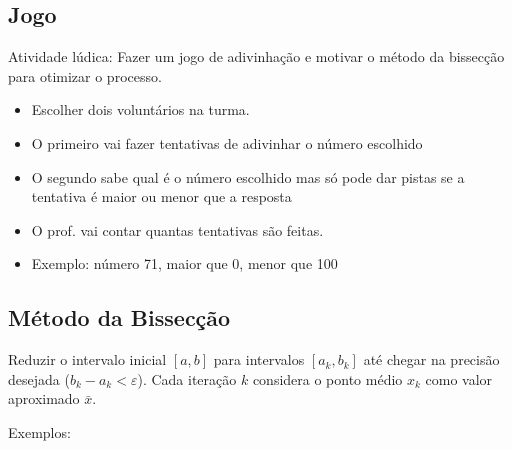 \documentclass[a4paper]{article}
\begin{document}
\subsection*{Jogo}

Atividade lúdica: Fazer um jogo de adivinhação e motivar o método da
bissecção para otimizar o processo.


\begin{itemize}
\item Escolher dois voluntários na turma.
\item O primeiro vai fazer tentativas de adivinhar o número escolhido
\item O segundo sabe qual é o número escolhido mas só pode dar pistas
  se a tentativa é maior ou menor que a resposta
\item O prof. vai contar quantas tentativas são feitas.
\item Exemplo: número 71, maior que 0, menor que 100
\end{itemize}

\clearpage
\subsection*{Método da Bissecção}

Reduzir o intervalo inicial $[a,b]$ para intervalos $[a_k,b_k]$ até
chegar na precisão desejada ($b_k - a_k < \varepsilon$). Cada iteração
$k$ considera o ponto médio $x_k$ como valor aproximado $\bar{x}$.

\bigskip
\begin{center}
\end{center}
\bigskip

Exemplos: 
\end{document}
